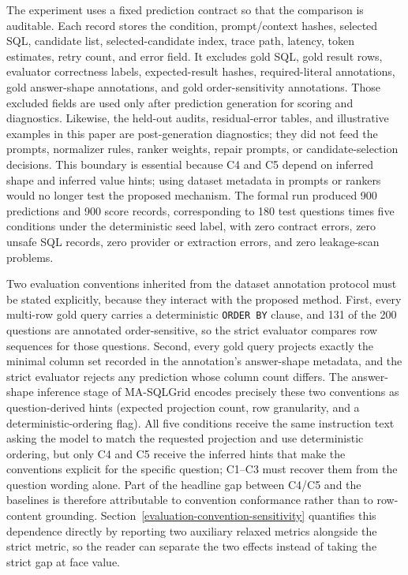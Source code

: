 \documentclass[cmc,article,submit,moreauthors,pdftex]{Definitions/tsp}
\begin{document}
The experiment uses a fixed prediction contract so that the comparison is auditable. Each record stores the condition, prompt/context hashes, selected SQL, candidate list, selected-candidate index, trace path, latency, token estimates, retry count, and error field. It excludes gold SQL, gold result rows, evaluator correctness labels, expected-result hashes, required-literal annotations, gold answer-shape annotations, and gold order-sensitivity annotations. Those excluded fields are used only after prediction generation for scoring and diagnostics. Likewise, the held-out audits, residual-error tables, and illustrative examples in this paper are post-generation diagnostics; they did not feed the prompts, normalizer rules, ranker weights, repair prompts, or candidate-selection decisions. This boundary is essential because C4 and C5 depend on inferred shape and inferred value hints; using dataset metadata in prompts or rankers would no longer test the proposed mechanism. The formal run produced 900 predictions and 900 score records, corresponding to 180 test questions times five conditions under the deterministic seed label, with zero contract errors, zero unsafe SQL records, zero provider or extraction errors, and zero leakage-scan problems.

Two evaluation conventions inherited from the dataset annotation protocol must be stated explicitly, because they interact with the proposed method. First, every multi-row gold query carries a deterministic \texttt{ORDER BY} clause, and 131 of the 200 questions are annotated order-sensitive, so the strict evaluator compares row sequences for those questions. Second, every gold query projects exactly the minimal column set recorded in the annotation's answer-shape metadata, and the strict evaluator rejects any prediction whose column count differs. The answer-shape inference stage of MA-SQLGrid encodes precisely these two conventions as question-derived hints (expected projection count, row granularity, and a deterministic-ordering flag). All five conditions receive the same instruction text asking the model to match the requested projection and use deterministic ordering, but only C4 and C5 receive the inferred hints that make the conventions explicit for the specific question; C1--C3 must recover them from the question wording alone. Part of the headline gap between C4/C5 and the baselines is therefore attributable to convention conformance rather than to row-content grounding. Section~\ref{evaluation-convention-sensitivity} quantifies this dependence directly by reporting two auxiliary relaxed metrics alongside the strict metric, so the reader can separate the two effects instead of taking the strict gap at face value.
\end{document}
